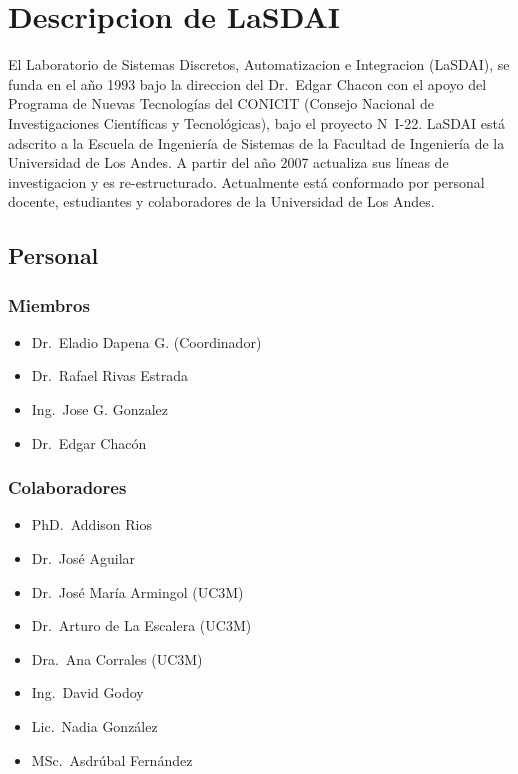 \section{Descripcion de LaSDAI}

El Laboratorio de Sistemas Discretos, Automatizacion e Integracion (LaSDAI), se funda en el año 1993 bajo la direccion del Dr.\ Edgar Chacon con el apoyo del Programa de Nuevas Tecnologías del CONICIT (Consejo Nacional de Investigaciones Científicas y Tecnológicas), bajo el proyecto N\textordmasculine\ I-22. LaSDAI está adscrito a la Escuela de Ingeniería de Sistemas de la Facultad de Ingeniería de la Universidad de Los Andes. A partir del año 2007 actualiza sus líneas de investigacion y es re-estructurado. Actualmente está conformado por personal docente, estudiantes y colaboradores de la Universidad de Los Andes.\cite{lasdaiInicio}

\subsection{Personal}

\subsubsection{Miembros}

\begin{itemize}
    \itemsep1pt \parskip0pt 
    \item Dr.\ Eladio Dapena G. (Coordinador)
    \item Dr.\ Rafael Rivas Estrada
    \item Ing.\ Jose G. Gonzalez
    \item Dr.\ Edgar Chacón
\end{itemize}

\subsubsection{Colaboradores}

\begin{itemize}
    \itemsep1pt \parskip0pt 
    \item PhD.\ Addison Rios
    \item Dr.\ José Aguilar
    \item Dr.\ José María Armingol (UC3M)
    \item Dr.\ Arturo de La Escalera (UC3M)
    \item Dra.\ Ana Corrales (UC3M)
    \item Ing.\ David Godoy
    \item Lic.\ Nadia González
    \item MSc.\ Asdrúbal Fernández
\end{itemize}

